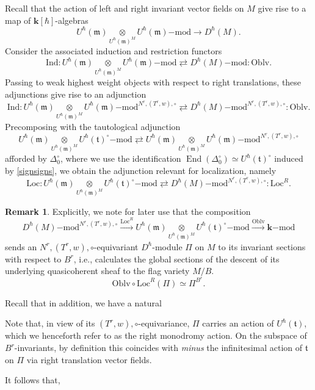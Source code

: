 \documentclass{amsart}
\theoremstyle{definition}
\newtheorem{Rem}[Thm]{Remark}
\newcommand{\fm}{\mathfrak{m}}
\newcommand{\lmod}{\on{-mod}}
\newcommand{\Oblv}{\on{Oblv}}
\newcommand{\sss}{\subsubsection{}}
\newcommand{\ft}{\mathfrak{t}}
\newcommand{\on}{\mathrm}
\newcommand{\bk}{\mathbf{k}}
\newcommand{\End}{\operatorname{End}}
\newcommand{\cM}{\Pi}
\numberwithin{equation}{section}
\begin{document}
\sss Recall that the action of left and right invariant vector fields on $M$ give rise to a map of $\bk[\hbar]$-algebras
$$U^\hbar(\fm) \underset{U^\hbar(\fm)^M} \otimes U^\hbar(\fm)\lmod \rightarrow  D^\hbar(M).$$
Consider the associated induction and restriction functors
$$\on{Ind}: U^\hbar(\fm) \underset{U^\hbar(\fm)^M} \otimes U^\hbar(\fm)\lmod \rightleftarrows  D^\hbar(M)\lmod: \on{Oblv}.$$
Passing to weak highest weight objects with respect to right translations, these adjunctions give rise to an adjunction 
$$\on{Ind}: U^\hbar(\fm) \underset{U^\hbar(\fm)^M} \otimes U^\hbar(\fm)\lmod^{N^r, (T^r, w), \circ} \rightleftarrows  D^\hbar(M)\lmod^{N^r, (T^r, w), \circ}: \on{Oblv}.$$
Precomposing with the tautological adjunction 
$$U^{\hbar}(\fm) \underset{U^\hbar(\fm)^M} \otimes U^\hbar(\ft)^\circ\lmod \rightleftarrows U^{\hbar}(\fm) \underset{U^\hbar(\fm)^M} \otimes U^{\hbar}(\fm)\lmod^{N^r, (T^r, w), \circ}$$afforded by $\Delta_0^\circ$, where we use the identification $\End(\Delta_0^\circ) \simeq U^\hbar(\ft)^\circ$ induced by \eqref{signsigns}, we obtain the adjunction relevant for localization, namely
\begin{equation} \label{e:loc}  \on{Loc}: U^\hbar(\fm) \underset{U^\hbar(\fm)^M} \otimes U^\hbar(\ft)^\circ\lmod \rightleftarrows D^\hbar(M)\lmod^{N^r, (T^r, w), \circ}: \on{Loc}^R.\end{equation}

 \iffalse 
{\color{red} \begin{Rem} Explicitly, we note for later use that the composition 
$$D^\hbar(M)\lmod^{N^r, (T^r, w), \circ} \xrightarrow{\on{Loc}^R} U^\hbar(\fm) \underset{U^\hbar(\fm)^M} \otimes U^\hbar(\ft)^\circ\lmod \xrightarrow{\Oblv} \bk\lmod $$
sends an $N^r, (T^r, w), \circ$-equivariant $D^\hbar$-module $\cM$ on $M$ to its invariant sections with respect to $B^r$, i.e., calculates the global sections of the descent of its underlying quasicoherent sheaf to the flag variety $M/B$. 
$$\on{Oblv} \circ \on{Loc}^R ( \cM ) \simeq \cM^{B^r}.$$

Recall that in addition, we have a natural 




Note that, in view of its $(T^r, w), \circ$-equivariance, $\cM$ carries an action of $U^{\hbar}(\ft)$, which we henceforth refer to as the right monodromy action. On the subspace of $B^r$-invariants, by definition this coincides with {\em minus} the infinitesimal action of $\ft$ on $\cM$ via right translation vector fields. 

It follows that, 


\end{Rem} 
} 
\end{document}
